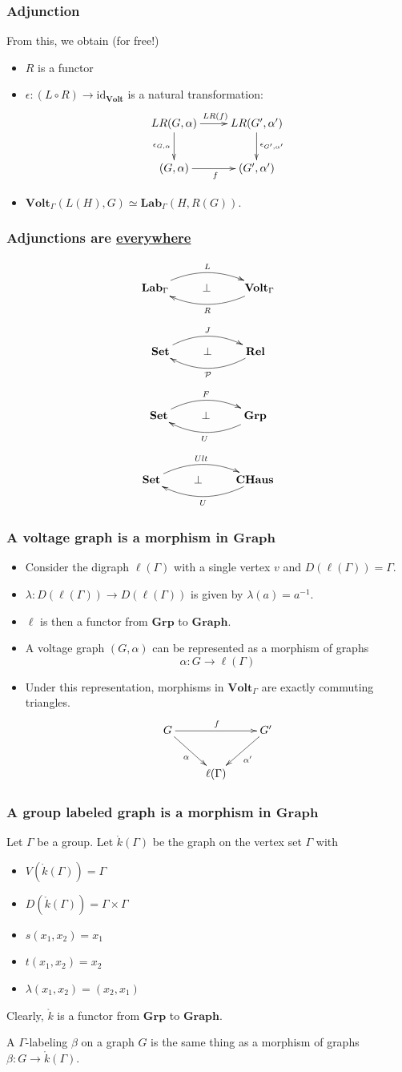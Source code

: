 \documentclass{beamer}
\makeatletter
\newcommand{\id}{\mathrm{id}}
\newcommand{\KG}{{\mathring{k}(Γ)}}
\renewcommand{\k}{\mathring{k}}
\newcommand{\lG}{{\ell(Γ)}}
\newcommand{\Graph}{\mathbf{Graph}}
\newcommand{\Volt}{\mathbf{Volt}}
\newcommand{\Lab}{\mathbf{Lab}}
\newcommand{\Set}{\mathbf{Set}}
\newcommand{\CHaus}{\mathbf{CHaus}}
\newcommand{\Rel}{\mathbf{Rel}}
\newcommand{\Grp}{\mathbf{Grp}}
\newcommand{\adjunction}[4]{
\xymatrix{
{#1}
	\ar@/^1.2pc/[rr]^-{#3}
&
\bot
&
{#2}
	\ar@/^1.2pc/[ll]^-{#4}
}
}
\makeatother
\begin{document}
\begin{frame}
\frametitle{Adjunction}
From this, we obtain (for free!)
\begin{itemize}
\item $R$ is a functor
\item $\epsilon\colon (L\circ R)\to \id_{\Volt}$ is a natural transformation:
\[
\xymatrix{
LR(G,\alpha)
    \ar[r]^{LR(f)}
    \ar[d]_{\epsilon_{G,\alpha}}
&
LR(G',\alpha')
    \ar[d]^{\epsilon_{G',\alpha'}}
\\
(G,\alpha)
    \ar[r]_f
&
(G',\alpha')
}
\]
\item $\Volt_\Gamma(L(H),G)\simeq\Lab_\Gamma(H,R(G))$.
\end{itemize}
\end{frame}
\begin{frame}
\frametitle{Adjunctions are \underline{everywhere}}
\[
\adjunction{\Lab_\Gamma}{\Volt_\Gamma}{L}{R}
\]
\[
\adjunction{\Set}{\Rel}{J}{\mathcal{P}}
\]
\[
\adjunction{\Set}{\Grp}{F}{U}
\]
\[
\adjunction{\Set}{\CHaus}{Ult}{U}
\]
\end{frame}
\begin{frame}
\frametitle{A voltage graph is a morphism in $\Graph$}
\begin{itemize}
\item Consider the digraph $\lG$ with a single
vertex $v$ and $D(\lG)=Γ$. 
\item $λ\colon D(\ell(Γ))\to D(\ell(Γ))$ is given by $λ(a)=a^{-1}$. 
\item $\ell$ is then a functor from $\Grp$ to $\Graph$. 
\item A voltage graph $(G,\alpha)$ can be represented as a morphism of graphs
\[
\alpha\colon G\to\ell(\Gamma)
\]
\item Under this representation, morphisms in $\Volt_\Gamma$ are exactly commuting
triangles.
\[
\xymatrix{
G
    \ar[rr]^f
    \ar[rd]_\alpha
&
&
G'
    \ar[ld]^{\alpha'}
\\
&
\ell(\Gamma)
}
\]
\end{itemize}
\end{frame}
\begin{frame}
\frametitle{A group labeled graph is a morphism in $\Graph$}

Let $\Gamma$ be a group. Let $\k(\Gamma)$ be the graph on the vertex set $\Gamma$ with
\begin{itemize}
\item $V(\k(\Gamma))=\Gamma$
\item $D(\k(\Gamma))=\Gamma×\Gamma$
\item $s(x_1,x_2)=x_1$
\item $t(x_1,x_2)=x_2$
\item $λ(x_1,x_2)=(x_2,x_1)$
\end{itemize}
Clearly, $\k$ is a functor from $\Grp$ to $\Graph$. 

A $Γ$-labeling $β$ on
a graph $G$ is the same thing as a morphism of graphs $\beta\colon G\to\KG$.
\end{frame}
\end{document}

